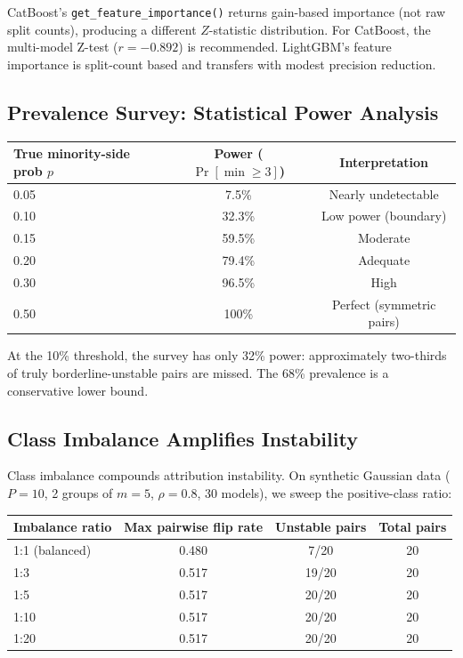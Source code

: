 \documentclass{article}
\begin{document}
CatBoost's \texttt{get\_feature\_importance()} returns gain-based importance (not raw split counts), producing a different $Z$-statistic distribution. For CatBoost, the multi-model Z-test ($r = -0.892$) is recommended. LightGBM's feature importance is split-count based and transfers with modest precision reduction.

\subsection{Prevalence Survey: Statistical Power Analysis}

\begin{center}
\small
\begin{tabular}{@{}lcc@{}}
\toprule
True minority-side prob $p$ & Power ($\Pr[\min \geq 3]$) & Interpretation \\
\midrule
0.05 & 7.5\% & Nearly undetectable \\
0.10 & 32.3\% & Low power (boundary) \\
0.15 & 59.5\% & Moderate \\
0.20 & 79.4\% & Adequate \\
0.30 & 96.5\% & High \\
0.50 & 100\% & Perfect (symmetric pairs) \\
\bottomrule
\end{tabular}
\end{center}

At the 10\% threshold, the survey has only 32\% power: approximately two-thirds of truly borderline-unstable pairs are missed. The 68\% prevalence is a conservative lower bound.

\subsection{Class Imbalance Amplifies Instability}
\label{sec:class-imbalance}

Class imbalance compounds attribution instability. On synthetic Gaussian data ($P{=}10$, 2 groups of $m{=}5$, $\rho{=}0.8$, 30 models), we sweep the positive-class ratio:

\begin{center}
\small
\begin{tabular}{@{}lccc@{}}
\toprule
Imbalance ratio & Max pairwise flip rate\footnotemark & Unstable pairs & Total pairs \\
\midrule
1:1 (balanced)  & 0.480 & 7/20  & 20 \\
1:3             & 0.517 & 19/20 & 20 \\
1:5             & 0.517 & 20/20 & 20 \\
1:10            & 0.517 & 20/20 & 20 \\
1:20            & 0.517 & 20/20 & 20 \\
\bottomrule
\end{tabular}
\end{center}
\end{document}
